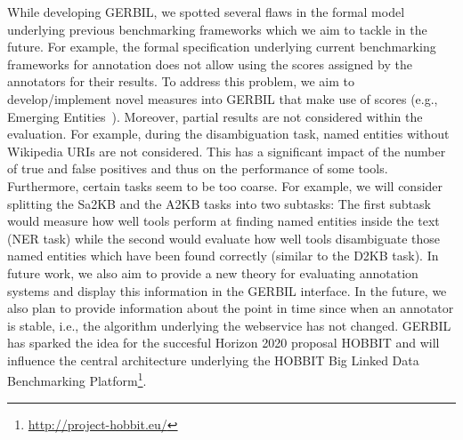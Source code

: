 
While developing GERBIL, we spotted several flaws in the formal model underlying previous benchmarking frameworks which we aim to tackle in the future. 
For example, the formal specification underlying current benchmarking frameworks for annotation does not allow using the scores assigned by the annotators for their results. To address this problem, we aim to develop/implement novel measures into GERBIL that make use of scores (e.g., Emerging Entities~\cite{Hoffart:2014:DEE:2566486.2568003}). 
Moreover, partial results are not considered within the evaluation. For example, during the disambiguation task, named entities without Wikipedia URIs are not considered. This has a significant impact of the number of true and false positives and thus on the performance of some tools.
Furthermore, certain tasks seem to be too coarse. For example, we will consider splitting the Sa2KB and the A2KB tasks into two subtasks: The first subtask would measure how well tools perform at finding named entities inside the text (\ac{NER} task) while the second would evaluate how well tools disambiguate those named entities which have been found correctly (similar to the D2KB task).
In future work, we also aim to provide a new theory for evaluating annotation systems and display this information in the GERBIL interface.
In the future, we also plan to provide information about the point in time since when an annotator is stable, i.e., the algorithm underlying the webservice has not changed.
GERBIL has sparked the idea for the succesful Horizon 2020 proposal HOBBIT and will influence the central architecture underlying the HOBBIT Big Linked Data Benchmarking Platform\footnote{\url{http://project-hobbit.eu/}}. 
